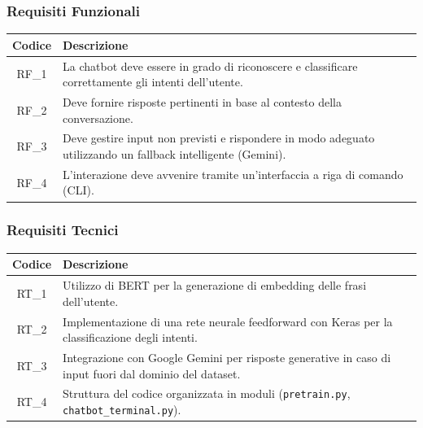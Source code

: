 \documentclass[12pt, letterpaper]{article}
\begin{document}
\subsubsection{Requisiti Funzionali}
\begin{table}[H]
\centering
\renewcommand{\arraystretch}{1.5} %
\begin{tabular}{|c|p{12cm}|}
\hline
\textbf{Codice} & \textbf{Descrizione} \\
\hline
RF\_1 & La chatbot deve essere in grado di riconoscere e classificare correttamente gli intenti dell’utente. \\
\hline
RF\_2 & Deve fornire risposte pertinenti in base al contesto della conversazione. \\
\hline
RF\_3 & Deve gestire input non previsti e rispondere in modo adeguato utilizzando un fallback intelligente (Gemini). \\
\hline
RF\_4 & L'interazione deve avvenire tramite un’interfaccia a riga di comando (CLI). \\
\hline
\end{tabular}
\label{tab:requisiti_funzionali}
\end{table}
\subsubsection{Requisiti Tecnici}
\begin{table}[H]
\centering
\renewcommand{\arraystretch}{1.5} %
\begin{tabular}{|c|p{12cm}|}
\hline
\textbf{Codice} & \textbf{Descrizione} \\
\hline
RT\_1 & Utilizzo di BERT per la generazione di embedding delle frasi dell’utente. \\
\hline
RT\_2 & Implementazione di una rete neurale feedforward con Keras per la classificazione degli intenti. \\
\hline
RT\_3 & Integrazione con Google Gemini per risposte generative in caso di input fuori dal dominio del dataset. \\
\hline
RT\_4 & Struttura del codice organizzata in moduli (\texttt{pretrain.py}, \texttt{chatbot\_terminal.py}). \\
\hline
\end{tabular}
\label{tab:requisiti_tecnici}
\end{table}
\end{document}
